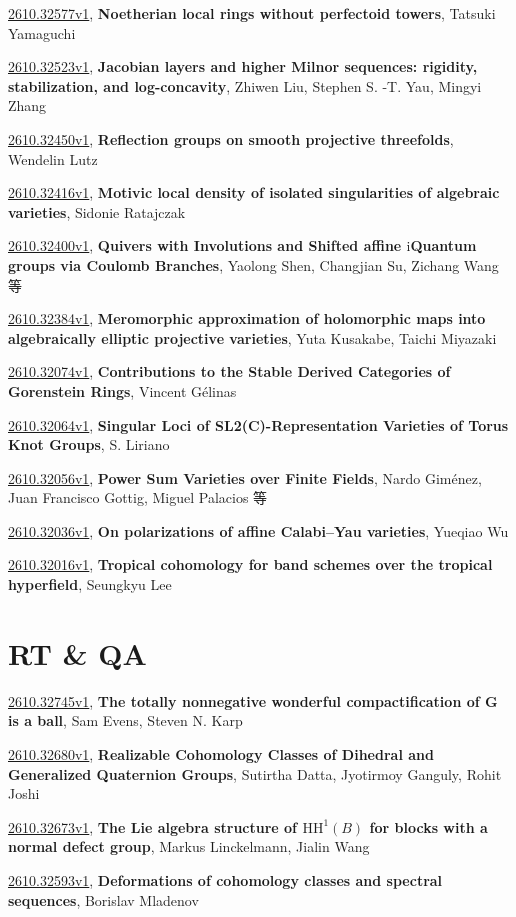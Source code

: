\documentclass[9pt, a4paper]{article}
\theoremstyle{plain}
\theoremstyle{definition}
\theoremstyle{remark}
\newcommand{\arxiv}[3]{\href{https://arxiv.org/abs/#1}{#1}, \textbf{\textcolor{arxivblue}{#2}}, #3}
\begin{document}
\arxiv{2610.32577v1}{Noetherian local rings without perfectoid towers}{Tatsuki Yamaguchi}

\arxiv{2610.32523v1}{Jacobian layers and higher Milnor sequences: rigidity, stabilization, and log-concavity}{Zhiwen Liu, Stephen S. -T. Yau, Mingyi Zhang}

\arxiv{2610.32450v1}{Reflection groups on smooth projective threefolds}{Wendelin Lutz}

\arxiv{2610.32416v1}{Motivic local density of isolated singularities of algebraic varieties}{Sidonie Ratajczak}

\arxiv{2610.32400v1}{Quivers with Involutions and Shifted affine $\mathrm{i}$Quantum groups via Coulomb Branches}{Yaolong Shen, Changjian Su, Zichang Wang 等}

\arxiv{2610.32384v1}{Meromorphic approximation of holomorphic maps into algebraically elliptic projective varieties}{Yuta Kusakabe, Taichi Miyazaki}

\arxiv{2610.32074v1}{Contributions to the Stable Derived Categories of Gorenstein Rings}{Vincent Gélinas}

\arxiv{2610.32064v1}{Singular Loci of SL2(C)-Representation Varieties of Torus Knot Groups}{S. Liriano}

\arxiv{2610.32056v1}{Power Sum Varieties over Finite Fields}{Nardo Giménez, Juan Francisco Gottig, Miguel Palacios 等}

\arxiv{2610.32036v1}{On polarizations of affine Calabi--Yau varieties}{Yueqiao Wu}

\arxiv{2610.32016v1}{Tropical cohomology for band schemes over the tropical hyperfield}{Seungkyu Lee}


\section{RT \& QA}
\arxiv{2610.32745v1}{The totally nonnegative wonderful compactification of G is a ball}{Sam Evens, Steven N. Karp}

\arxiv{2610.32680v1}{Realizable Cohomology Classes of Dihedral and Generalized Quaternion Groups}{Sutirtha Datta, Jyotirmoy Ganguly, Rohit Joshi}

\arxiv{2610.32673v1}{The Lie algebra structure of $\mathrm{HH}^1(B)$ for blocks with a normal defect group}{Markus Linckelmann, Jialin Wang}

\arxiv{2610.32593v1}{Deformations of cohomology classes and spectral sequences}{Borislav Mladenov}
\end{document}

